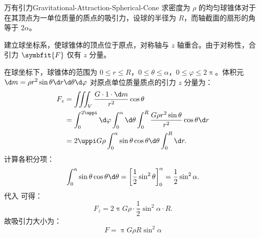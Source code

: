 \begin{problem}{万有引力}{Gravitational-Attraction-Spherical-Cone}
    求密度为 $\rho$ 的均匀球锥体对于在其顶点为一单位质量的质点的吸引力，设球的半径为 $R$，而轴截面的扇形的角等于 $2\alpha$。
\end{problem}

\begin{solution}
    建立球坐标系，使球锥体的顶点位于原点，对称轴与 $z$ 轴重合。由于对称性，合引力 $\symbfit{F}$ 仅有 $z$ 分量。

    在球坐标下，球锥体的范围为 $0 \le r \le R$，$0 \le \theta \le \alpha$，$0 \le \varphi \le 2\uppi$。体积元 $\d m = \rho r^2 \sin \theta \d r \d \theta \d \varphi$ 对原点单位质量质点的引力 $z$ 分量为：
    \begin{equation}
        \label{eq:gravity-integral}
        \begin{aligned}
            F_z & = \iiint_V \frac{G \cdot 1 \cdot \d m}{r^2} \cos \theta                                                             \\
                & = \int_0^{2\uppi} \d \varphi \int_0^{\alpha} \d \theta \int_0^R \frac{G \rho r^2 \sin \theta}{r^2} \cos \theta \d r \\
                & = 2\uppi G \rho \int_0^{\alpha} \sin \theta \cos \theta \d \theta \int_0^R \d r.
        \end{aligned}
    \end{equation}
    计算各积分项：
    \begin{equation}
        \int_0^{\alpha} \sin \theta \cos \theta \d \theta = \left[ \frac{1}{2} \sin^2 \theta \right]_0^{\alpha} = \frac{1}{2} \sin^2 \alpha.
    \end{equation}
    代入  可得：
    \begin{equation}
        F_z = 2\uppi G \rho \cdot \frac{1}{2} \sin^2 \alpha \cdot R.
    \end{equation}
    故吸引力大小为：
    \begin{equation}
        F = \boxed{ \uppi G \rho R \sin^2 \alpha }
    \end{equation}
\end{solution}

\endinput
